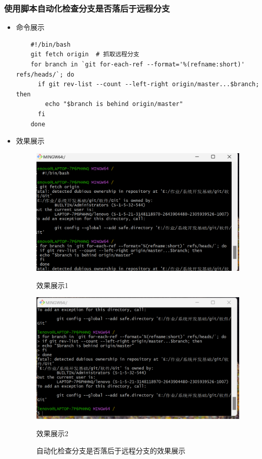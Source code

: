 \documentclass[UTF8]{ctexart}
\begin{document}
\subsubsection{使用脚本自动化检查分支是否落后于远程分支}
\begin{itemize}
  \item 命令展示
  \begin{verbatim}
    #!/bin/bash
    git fetch origin  # 抓取远程分支
    for branch in `git for-each-ref --format='%(refname:short)' refs/heads/`; do
      if git rev-list --count --left-right origin/master...$branch; then
        echo "$branch is behind origin/master"
      fi
    done
  \end{verbatim}

  \item 效果展示
  \begin{figure}[H]
    \centering
    \begin{minipage}{0.5\textwidth}
      \includegraphics[width=\linewidth]{22}
      \caption{效果展示1}
      \label{fig:branch-comparison-1}
    \end{minipage}%
    \begin{minipage}{0.5\textwidth}
      \includegraphics[width=\linewidth]{23}
      \caption{效果展示2}
      \label{fig:branch-comparison-2}
    \end{minipage}
    \caption{自动化检查分支是否落后于远程分支的效果展示}
    \label{fig:branch-check}
  \end{figure}
\end{itemize}
\end{document}
